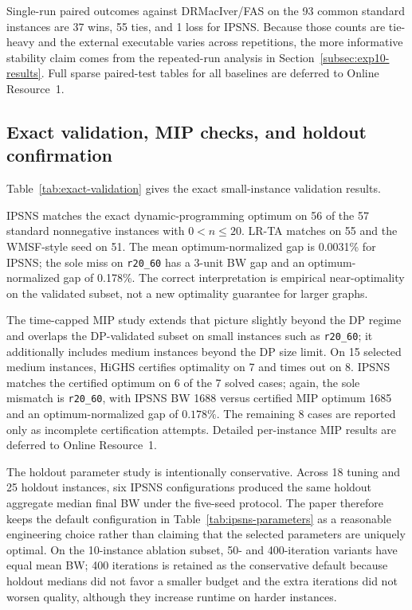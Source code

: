 Single-run paired outcomes against DRMacIver/FAS on the 93 common standard instances are 37 wins, 55 ties, and 1 loss for IPSNS. Because those counts are tie-heavy and the external executable varies across repetitions, the more informative stability claim comes from the repeated-run analysis in Section~\ref{subsec:exp10-results}. Full sparse paired-test tables for all baselines are deferred to Online Resource~1.



\subsection{Exact validation, MIP checks, and holdout confirmation}

Table~\ref{tab:exact-validation} gives the exact small-instance validation results.



IPSNS matches the exact dynamic-programming optimum on 56 of the 57 standard nonnegative instances with \(0<n\le 20\). LR-TA matches on 55 and the WMSF-style seed on 51. The mean optimum-normalized gap is 0.0031\% for IPSNS; the sole miss on \texttt{r20\_60} has a 3-unit BW gap and an optimum-normalized gap of 0.178\%. The correct interpretation is empirical near-optimality on the validated subset, not a new optimality guarantee for larger graphs.

The time-capped MIP study extends that picture slightly beyond the DP regime and overlaps the DP-validated subset on small instances such as \texttt{r20\_60}; it additionally includes medium instances beyond the DP size limit. On 15 selected medium instances, HiGHS certifies optimality on 7 and times out on 8. IPSNS matches the certified optimum on 6 of the 7 solved cases; again, the sole mismatch is \texttt{r20\_60}, with IPSNS BW 1688 versus certified MIP optimum 1685 and an optimum-normalized gap of \(0.178\%\). The remaining 8 cases are reported only as incomplete certification attempts. Detailed per-instance MIP results are deferred to Online Resource~1.

The holdout parameter study is intentionally conservative. Across 18 tuning and 25 holdout instances, six IPSNS configurations produced the same holdout aggregate median final BW under the five-seed protocol. The paper therefore keeps the default configuration in Table~\ref{tab:ipsns-parameters} as a reasonable engineering choice rather than claiming that the selected parameters are uniquely optimal. On the 10-instance ablation subset, 50- and 400-iteration variants have equal mean BW; 400 iterations is retained as the conservative default because holdout medians did not favor a smaller budget and the extra iterations did not worsen quality, although they increase runtime on harder instances.

